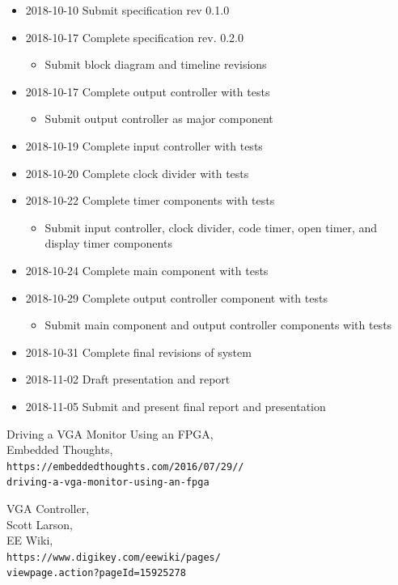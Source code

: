 \documentclass[11pt]{article}
\begin{document}
\begin{itemize}
	\item 2018-10-10 Submit specification rev 0.1.0
	\item 2018-10-17 Complete specification rev. 0.2.0
	\begin{itemize}
		\item Submit block diagram and timeline revisions
	\end{itemize}
	\item 2018-10-17 Complete output controller with tests
	\begin{itemize}
		\item Submit output controller as major component
	\end{itemize}
	\item 2018-10-19 Complete input controller with tests
	\item 2018-10-20 Complete clock divider with tests
	\item 2018-10-22 Complete timer components with tests
	\begin{itemize}
		\item Submit input controller, clock divider, code timer, open timer, and display timer components
	\end{itemize}
	\item 2018-10-24 Complete main component with tests
	\item 2018-10-29 Complete output controller component with tests
	\begin{itemize}
		\item Submit main component and output controller components with tests
	\end{itemize}
	\item 2018-10-31 Complete final revisions of system
	\item 2018-11-02 Draft presentation and report
	\item 2018-11-05 Submit and present final report and presentation
\end{itemize}

\begin{thebibliography}{9}

  Driving a VGA Monitor Using an FPGA, \\
  Embedded Thoughts, \\
  \verb!https://embeddedthoughts.com/2016/07/29//! \\
  \verb!driving-a-vga-monitor-using-an-fpga!
 
  VGA Controller, \\
  Scott Larson, \\
  EE Wiki, \\
  \verb!https://www.digikey.com/eewiki/pages/! \\
  \verb!viewpage.action?pageId=15925278!
\end{thebibliography}
\end{document}

